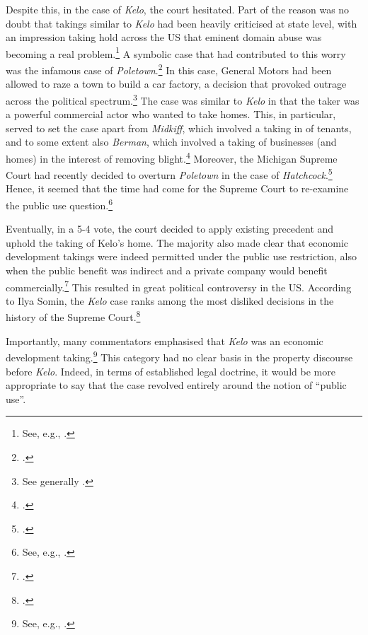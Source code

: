 Despite this, in the case of {\it Kelo}, the court hesitated. Part of the reason was no doubt that takings similar to {\it Kelo} had been heavily criticised at state level, with an impression taking hold across the US that eminent domain abuse was becoming a real problem.\footnote{See, e.g., \cite[667-669]{sandefur05}.} A symbolic case that had contributed to this worry was the infamous case of {\it Poletown}.\footcite{poletown81} In this case, General Motors had been allowed to raze a town to build a car factory, a decision that provoked outrage across the political spectrum.\footnote{See generally \cite{sandefur05}.} The case was similar to {\it Kelo} in that the taker was a powerful commercial actor who wanted to take homes. This, in particular, served to set the case apart from {\it Midkiff}, which involved a taking in  of tenants, and to some extent also {\it Berman}, which involved a taking of businesses (and homes) in the interest of removing blight.\footnote{\cite{berman54,midkiff84}.} Moreover, the Michigan Supreme Court had recently decided to overturn {\it Poletown} in the case of {\it Hatchcock}.\footcite{wayne04} Hence, it seemed that the time had come for the Supreme Court to re-examine the public use question.\footnote{See, e.g., \cite{sandefur05,claeys04}.}

Eventually, in a 5-4 vote, the court decided to apply existing precedent and uphold the taking of  Kelo's home. The majority also made clear that economic development takings were indeed permitted under the public use restriction, also when the public benefit was indirect and a private company would benefit commercially.\footcite[469-470]{kelo05} This resulted in great political controversy in the US. According to Ilya Somin, the {\it Kelo} case ranks among the most disliked decisions in the history of the Supreme Court.\footcite[2]{somin11} 

Importantly, many commentators emphasised that {\it Kelo} was an economic development taking.\footnote{See, e.g., \cite{somin07,cohen06}.} This category had no clear basis in the property discourse before {\it Kelo}. Indeed, in terms of established legal doctrine, it would be more appropriate to say that the case revolved entirely around the notion of ``public use''.

